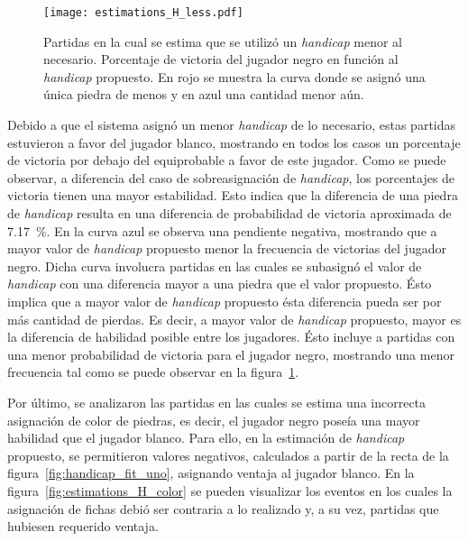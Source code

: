 \documentclass[11pt,twoside,spanish]{report} %
\begin{document}
\begin{figure}[H]
    \centering
    \texttt{[image: estimations\_H\_less.pdf]}
    \caption{Partidas en la cual se estima que se utiliz\'o un \textit{handicap} menor al necesario. Porcentaje de victoria del jugador negro en funci\'on al \textit{handicap} propuesto.  En rojo se muestra la curva donde se asign\'o  una \'unica piedra de menos  y en azul una cantidad menor a\'un.}
    \label{fig:handicap_porcentaje_de_menos}
\end{figure}



Debido a que el sistema asign\'o un menor \textit{handicap} de lo necesario, estas partidas estuvieron a favor del jugador blanco, mostrando en todos los casos un porcentaje de victoria por debajo del equiprobable a favor de este jugador.
Como se puede observar, a diferencia del caso de sobreasignaci\'on de \textit{handicap}, los porcentajes de victoria tienen una mayor estabilidad.
Esto indica que la diferencia de una piedra de \textit{handicap} resulta en una diferencia de probabilidad de victoria aproximada de \SI{7.17}{\percent}.
En la curva azul se observa una pendiente negativa, mostrando que a mayor valor de \textit{handicap} propuesto menor la frecuencia de victorias del jugador negro.
Dicha curva involucra partidas en las cuales se subasign\'o el valor de \textit{handicap} con una diferencia mayor a una piedra que el valor propuesto.
\'Esto implica que a mayor valor de \textit{handicap} propuesto \'esta diferencia pueda ser por m\'as cantidad de pierdas.
Es decir, a mayor valor de \textit{handicap} propuesto,  mayor es la diferencia de habilidad posible entre los jugadores.
\'Esto incluye a partidas con una menor probabilidad de victoria para el jugador negro, mostrando una menor frecuencia tal como se puede observar en la figura~\ref{fig:handicap_porcentaje_de_menos}.


Por \'ultimo, se analizaron las partidas en las cuales se estima una incorrecta asignaci\'on de color de piedras, es decir, el jugador negro pose\'ia una mayor habilidad que el jugador blanco.
Para ello, en la estimaci\'on de \textit{handicap} propuesto, se permitieron valores negativos, calculados a partir de la recta de la figura~\ref{fig:handicap_fit_uno}, asignando ventaja al jugador blanco.
En la figura~\ref{fig:estimations_H_color} se pueden visualizar los eventos en los cuales la asignaci\'on de fichas debi\'o ser contraria a lo realizado y, a su vez, partidas que hubiesen requerido ventaja.
\end{document}
